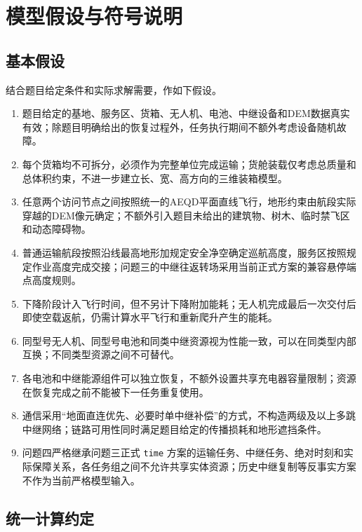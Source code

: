 \documentclass[UTF8,a4paper,12pt]{ctexart}
\begin{document}
\section{模型假设与符号说明}
\label{sec:assumptions_symbols}

\subsection{基本假设}

结合题目给定条件和实际求解需要，作如下假设。

\begin{enumerate}[label=\textbf{假设\arabic*.},leftmargin=3.5em]
\item 题目给定的基地、服务区、货箱、无人机、电池、中继设备和DEM数据真实有效；除题目明确给出的恢复过程外，任务执行期间不额外考虑设备随机故障。
\item 每个货箱均不可拆分，必须作为完整单位完成运输；货舱装载仅考虑总质量和总体积约束，不进一步建立长、宽、高方向的三维装箱模型。
\item 任意两个访问节点之间按照统一的AEQD平面直线飞行，地形约束由航段实际穿越的DEM像元确定；不额外引入题目未给出的建筑物、树木、临时禁飞区和动态障碍物。
\item 普通运输航段按照沿线最高地形加规定安全净空确定巡航高度，服务区按照规定作业高度完成交接；问题三的中继往返转场采用当前正式方案的兼容悬停端点高度规则。
\item 下降阶段计入飞行时间，但不另计下降附加能耗；无人机完成最后一次交付后即使空载返航，仍需计算水平飞行和重新爬升产生的能耗。
\item 同型号无人机、同型号电池和同类中继资源视为性能一致，可以在同类型内部互换；不同类型资源之间不可替代。
\item 各电池和中继能源组件可以独立恢复，不额外设置共享充电器容量限制；资源在恢复完成之前不能被下一任务重复使用。
\item 通信采用“地面直连优先、必要时单中继补偿”的方式，不构造两级及以上多跳中继网络；链路可用性同时满足题目给定的传播损耗和地形遮挡条件。
\item 问题四严格继承问题三正式 \texttt{time} 方案的运输任务、中继任务、绝对时刻和实际保障关系，各任务组之间不允许共享实体资源；历史中继复制等反事实方案不作为当前严格模型输入。
\end{enumerate}

\subsection{统一计算约定}
\end{document}
